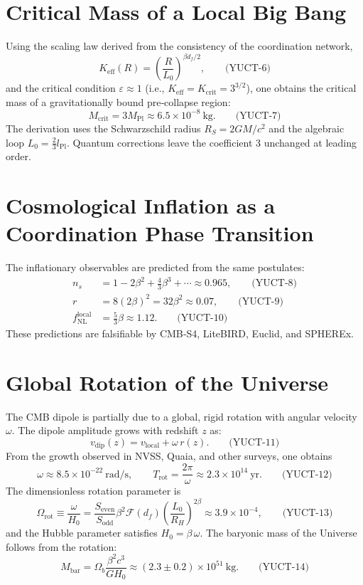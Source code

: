 \documentclass[12pt,a4paper]{article}
\newcommand{\Keff}{K_{\mathrm{eff}}}
\newcommand{\betaf}{\beta}
\newcommand{\Lpl}{l_{\mathrm{Pl}}}
\newcommand{\Sodd}{S_{\mathrm{odd}}}
\newcommand{\Seven}{S_{\mathrm{even}}}
\newcommand{\Lzero}{L_0}
\newcommand{\Mbar}{M_{\mathrm{bar}}}
\begin{document}
	\section{Critical Mass of a Local Big Bang}
	
	Using the scaling law derived from the consistency of the coordination network,
	\[
	\Keff(R) = \left(\frac{R}{\Lzero}\right)^{\betaf d_f/2}, \qquad\text{(YUCT-6)}
	\]
	and the critical condition \(\varepsilon \approx 1\) (i.e., \(\Keff = K_{\mathrm{crit}} = 3^{3/2}\)), one obtains the critical mass of a gravitationally bound pre‑collapse region:
	\[
	M_{\mathrm{crit}} = 3 M_{\mathrm{Pl}} \approx 6.5\times 10^{-8}\ \mathrm{kg}. \qquad\text{(YUCT-7)}
	\]
	The derivation uses the Schwarzschild radius \(R_S = 2GM/c^2\) and the algebraic loop \(\Lzero = \frac{2}{3}\Lpl\). Quantum corrections leave the coefficient 3 unchanged at leading order.
	
	\section{Cosmological Inflation as a Coordination Phase Transition}
	
	The inflationary observables are predicted from the same postulates:
	\begin{align}
		n_s &= 1 - 2\betaf^2 + \frac{4}{3}\betaf^3 + \cdots \approx 0.965, \qquad\text{(YUCT-8)}\\
		r &= 8(2\betaf)^2 = 32\betaf^2 \approx 0.07, \qquad\text{(YUCT-9)}\\
		f_{\mathrm{NL}}^{\mathrm{local}} &= \frac{5}{3}\betaf \approx 1.12. \qquad\text{(YUCT-10)}
	\end{align}
	These predictions are falsifiable by CMB‑S4, LiteBIRD, Euclid, and SPHEREx.
	
	\section{Global Rotation of the Universe}
	
	The CMB dipole is partially due to a global, rigid rotation with angular velocity \(\omega\). The dipole amplitude grows with redshift \(z\) as:
	\[
	v_{\mathrm{dip}}(z) = v_{\mathrm{local}} + \omega\, r(z). \qquad\text{(YUCT-11)}
	\]
	From the growth observed in NVSS, Quaia, and other surveys, one obtains
	\[
	\omega \approx 8.5\times 10^{-22}\ \mathrm{rad/s},\qquad
	T_{\mathrm{rot}} = \frac{2\pi}{\omega} \approx 2.3\times 10^{14}\ \mathrm{yr}. \qquad\text{(YUCT-12)}
	\]
	The dimensionless rotation parameter is
	\[
	\Omega_{\mathrm{rot}} \equiv \frac{\omega}{H_0} = \frac{\Seven}{\Sodd} \betaf^2 \mathcal{F}(d_f)\left(\frac{L_0}{R_H}\right)^{2\betaf} \approx 3.9\times 10^{-4}, \qquad\text{(YUCT-13)}
	\]
	and the Hubble parameter satisfies \(H_0 = \betaf\,\omega\). The baryonic mass of the Universe follows from the rotation:
	\[
	\Mbar = \Omega_b\frac{\betaf^2 c^3}{G H_0} \approx (2.3\pm 0.2)\times 10^{51}\ \mathrm{kg}. \qquad\text{(YUCT-14)}
	\]
	
\end{document}
